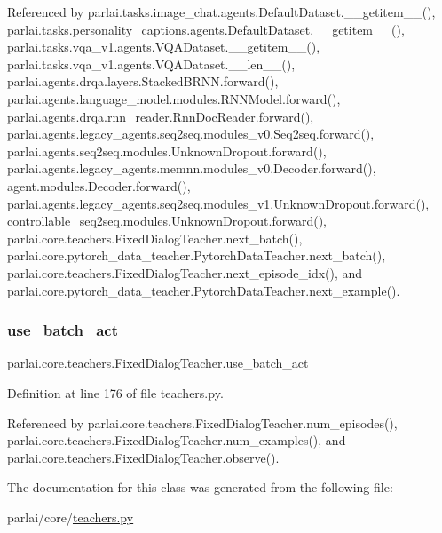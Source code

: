 Referenced by parlai.\+tasks.\+image\+\_\+chat.\+agents.\+Default\+Dataset.\+\_\+\+\_\+getitem\+\_\+\+\_\+(), parlai.\+tasks.\+personality\+\_\+captions.\+agents.\+Default\+Dataset.\+\_\+\+\_\+getitem\+\_\+\+\_\+(), parlai.\+tasks.\+vqa\+\_\+v1.\+agents.\+V\+Q\+A\+Dataset.\+\_\+\+\_\+getitem\+\_\+\+\_\+(), parlai.\+tasks.\+vqa\+\_\+v1.\+agents.\+V\+Q\+A\+Dataset.\+\_\+\+\_\+len\+\_\+\+\_\+(), parlai.\+agents.\+drqa.\+layers.\+Stacked\+B\+R\+N\+N.\+forward(), parlai.\+agents.\+language\+\_\+model.\+modules.\+R\+N\+N\+Model.\+forward(), parlai.\+agents.\+drqa.\+rnn\+\_\+reader.\+Rnn\+Doc\+Reader.\+forward(), parlai.\+agents.\+legacy\+\_\+agents.\+seq2seq.\+modules\+\_\+v0.\+Seq2seq.\+forward(), parlai.\+agents.\+seq2seq.\+modules.\+Unknown\+Dropout.\+forward(), parlai.\+agents.\+legacy\+\_\+agents.\+memnn.\+modules\+\_\+v0.\+Decoder.\+forward(), agent.\+modules.\+Decoder.\+forward(), parlai.\+agents.\+legacy\+\_\+agents.\+seq2seq.\+modules\+\_\+v1.\+Unknown\+Dropout.\+forward(), controllable\+\_\+seq2seq.\+modules.\+Unknown\+Dropout.\+forward(), parlai.\+core.\+teachers.\+Fixed\+Dialog\+Teacher.\+next\+\_\+batch(), parlai.\+core.\+pytorch\+\_\+data\+\_\+teacher.\+Pytorch\+Data\+Teacher.\+next\+\_\+batch(), parlai.\+core.\+teachers.\+Fixed\+Dialog\+Teacher.\+next\+\_\+episode\+\_\+idx(), and parlai.\+core.\+pytorch\+\_\+data\+\_\+teacher.\+Pytorch\+Data\+Teacher.\+next\+\_\+example().

\mbox{\label{classparlai_1_1core_1_1teachers_1_1FixedDialogTeacher_a8a551d24fa77a0eb880cbee90b507f7e}} 
\subsubsection{\texorpdfstring{use\+\_\+batch\+\_\+act}{use\_batch\_act}}
{\footnotesize\ttfamily parlai.\+core.\+teachers.\+Fixed\+Dialog\+Teacher.\+use\+\_\+batch\+\_\+act}



Definition at line 176 of file teachers.\+py.



Referenced by parlai.\+core.\+teachers.\+Fixed\+Dialog\+Teacher.\+num\+\_\+episodes(), parlai.\+core.\+teachers.\+Fixed\+Dialog\+Teacher.\+num\+\_\+examples(), and parlai.\+core.\+teachers.\+Fixed\+Dialog\+Teacher.\+observe().



The documentation for this class was generated from the following file\+:\begin{DoxyCompactItemize}
\item 
parlai/core/\hyperlink{teachers_8py}{teachers.\+py}\end{DoxyCompactItemize}
